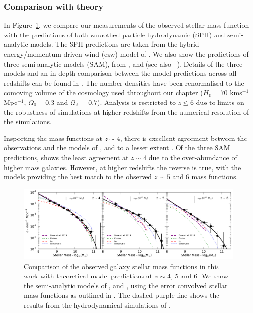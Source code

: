 \subsubsection{Comparison with theory}\label{sec:theory}
In Figure~\ref{fig:smf_theory}, we compare our measurements of the observed stellar mass function with the predictions of both smoothed particle hydrodynamic (SPH) and semi-analytic models. The SPH predictions are taken from the hybrid energy/momentum-driven wind (ezw) model of \citet{Dave:2013bf}. We also show the predictions of three semi-analytic models (SAM), from \citet{Croton:2006ew}, \citet{Lu:2011hj} and \citet{Somerville:2008ed} (see also \citeauthor{Somerville:2012cq}~\citeyear{Somerville:2012cq}). Details of the three models and an in-depth comparison between the model predictions across all redshifts can be found in \citet{Lu:2013ui}. The number densities have been renormalised to the comoving volume of the cosmology used throughout our chapter ($H_{0} = 70$ kms$^{-1}$Mpc$^{-1}$, $\Omega_{0}=0.3$ and $\Omega_{\Lambda}=0.7$). Analysis is restricted to $z \leq 6$ due to limits on the robustness of simulations at higher redshifts from the numerical resolution of the simulations.

Inspecting the mass functions at $z \sim 4$, there is excellent agreement between the observations and the models of \citet{Dave:2013bf}, \citet{Croton:2006ew} and to a lesser extent \citet{Lu:2011hj}. Of the three SAM predictions, \citet{Somerville:2008ed} shows the least agreement at $z\sim 4$ due to the over-abundance of higher mass galaxies. However, at higher redshifts the reverse is true, with the \citet{Somerville:2008ed} models providing the best match to the observed $z\sim5$ and 6 mass functions.

\begin{landscape}
\begin{figure}
\centering
\includegraphics[width=0.8\paperheight	]{plots/fig11.pdf}
\caption[Comparison of the observed galaxy stellar mass functions in this work with theoretical model predictions at $z \sim 4$, 5 and 6.]{Comparison of the observed galaxy stellar mass functions in this work with theoretical model predictions at $z \sim 4$, 5 and 6. We show the semi-analytic models of \citet{Croton:2006ew}, \citet{Somerville:2008ed} and \citet{Lu:2011hj}, using the error convolved stellar mass functions as outlined in \citet{Lu:2013ui}. The dashed purple line shows the results from the hydrodynamical simulations of \citet{Dave:2013bf}.}
\label{fig:smf_theory}
\end{figure}
\end{landscape}

